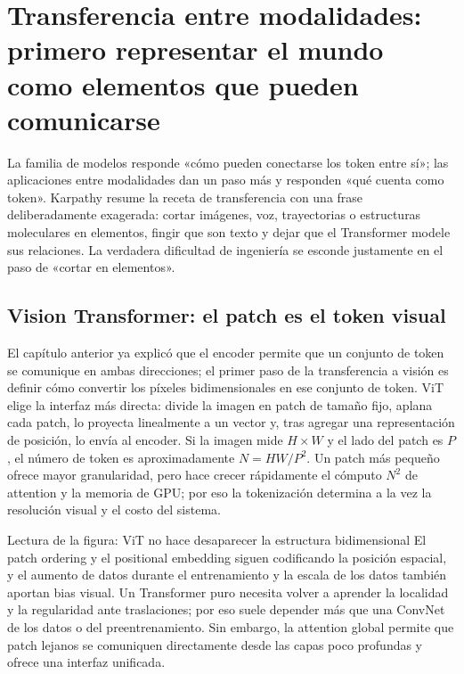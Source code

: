 \section{Transferencia entre modalidades: primero representar el mundo como elementos que pueden comunicarse}

La familia de modelos responde «cómo pueden conectarse los token entre sí»; las aplicaciones entre modalidades dan un paso más y responden «qué cuenta como token». Karpathy resume la receta de transferencia con una frase deliberadamente exagerada: cortar imágenes, voz, trayectorias o estructuras moleculares en elementos, fingir que son texto y dejar que el Transformer modele sus relaciones. La verdadera dificultad de ingeniería se esconde justamente en el paso de «cortar en elementos».

\subsection{Vision Transformer: el patch es el token visual}

El capítulo anterior ya explicó que el encoder permite que un conjunto de token se comunique en ambas direcciones; el primer paso de la transferencia a visión es definir cómo convertir los píxeles bidimensionales en ese conjunto de token. ViT elige la interfaz más directa: divide la imagen en patch de tamaño fijo, aplana cada patch, lo proyecta linealmente a un vector y, tras agregar una representación de posición, lo envía al encoder. Si la imagen mide $H\times W$ y el lado del patch es $P$, el número de token es aproximadamente $N=HW/P^2$. Un patch más pequeño ofrece mayor granularidad, pero hace crecer rápidamente el cómputo $N^2$ de attention y la memoria de GPU; por eso la tokenización determina a la vez la resolución visual y el costo del sistema.


\begin{knowledgebox}{Lectura de la figura: ViT no hace desaparecer la estructura bidimensional}
El patch ordering y el positional embedding siguen codificando la posición espacial, y el aumento de datos durante el entrenamiento y la escala de los datos también aportan bias visual. Un Transformer puro necesita volver a aprender la localidad y la regularidad ante traslaciones; por eso suele depender más que una ConvNet de los datos o del preentrenamiento. Sin embargo, la attention global permite que patch lejanos se comuniquen directamente desde las capas poco profundas y ofrece una interfaz unificada.
\end{knowledgebox}


